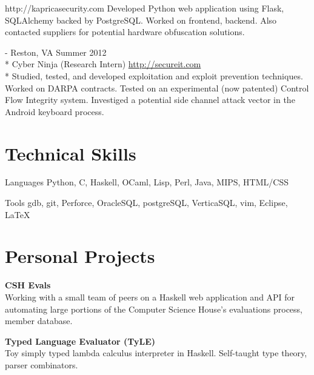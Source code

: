 \documentclass[letter,margin,line]{resume}
\newcommand{\rurl}[1]{\hfill {\footnotesize \url{#1}}}
\newcommand{\rdate}[1]{\hfill {\small #1}}
\renewcommand{\employer}[6]{\item[#1] - #2 \rdate{#3} \\* #4 \rurl{#5}\\* #6}
\newcommand{\project}[2]{\item {\bf #1}\\{\small #2}\\}
\begin{document}
\begin{resume}
\begin{asparadesc}
                     {http://kapricasecurity.com}
                     {Developed Python web application using Flask,
                      SQLAlchemy backed by PostgreSQL.
                      Worked on frontend, backend. Also contacted suppliers
                      for potential hardware obfuscation solutions.
                     }\\
            \employer{SecureIT}
                     {Reston, VA}
                     {Summer 2012}
                     {Cyber Ninja (Research Intern)}
                     {http://secureit.com}
                     {Studied, tested, and developed exploitation and
                      exploit prevention techniques.
                      Worked on DARPA contracts. 
                      Tested on an experimental (now patented)
                      Control Flow Integrity system.
                      Investiged a potential side channel attack vector
                      in the Android keyboard process.
                     }
        \end{asparadesc}

        \section{\mysidestyle Technical Skills}
        \begin{compactdesc}
        \item[Languages] { \small
                 Python,
                 C,
                 Haskell,
                 OCaml,
                 Lisp,
                 Perl,
                 Java,
                 MIPS,
                 HTML/CSS
            }
        \item[Tools] { \small
                gdb,
                git,
                Perforce,
                OracleSQL,
                postgreSQL,
                VerticaSQL,
                vim,
                Eclipse,
                \LaTeX
            }
        \end{compactdesc}
        \section{\mysidestyle Personal Projects}
        \begin{asparablank}
            \project{CSH Evals}
            {
                Working with a small team of peers on a Haskell web application
                and API for automating large portions of the Computer Science
                House's evaluations process, member database.
            }
            \project{Typed Language Evaluator (TyLE)}
            {
                Toy simply typed lambda calculus interpreter in Haskell.
                Self-taught type theory, parser combinators.
            }
        \end{asparablank}

\end{resume}
\end{document}
